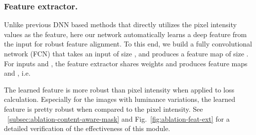 \documentclass[runningheads]{llncs}
\begin{document}
\subsubsection{Feature extractor.}
Unlike previous DNN based methods that directly utilizes the pixel intensity values as the feature, here our network automatically learns a deep feature from the input for robust feature alignment. To this end, we build a fully convolutional network (FCN) that takes an input of size , and produces a feature map of size . For inputs  and , the feature extractor shares weights and produces feature maps  and , i.e.


The learned feature is more robust than pixel intensity when applied to loss calculation. Especially for the images with luminance variations, the learned feature is pretty robust when compared to the pixel intensity. See \secname~\ref{subsec:ablation-content-aware-mask} and Fig.~\ref{fig:ablation-feat-ext} for a detailed verification of the effectiveness of this module. 
\end{document}
